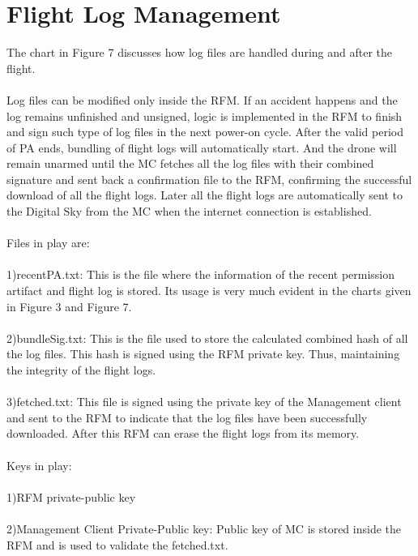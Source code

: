 \documentclass[18pt]{article}
\begin{document}
\section{Flight Log Management}
The chart in Figure 7 discusses how log files are handled during and after the flight.\\
\\
Log files can be modified only inside the RFM. If an accident happens and the log remains unfinished and unsigned, logic is implemented in the RFM to finish and sign such type of log files in the next power-on cycle.
After the valid period of PA ends, bundling of flight logs will automatically start. And the drone will remain unarmed until the MC fetches all the log files with their combined signature and sent back a confirmation file to the RFM, confirming the successful download of all the flight logs. Later all the flight logs are automatically sent to the Digital Sky from the MC when the internet connection is established.\\
\\
Files in play are:\\
\\
1)recentPA.txt: This is the file where the information of the recent permission artifact and flight log is stored. Its usage is very much evident in the charts given in Figure 3 and Figure 7.\\
\\
2)bundleSig.txt: This is the file used to store the calculated combined hash of all the log files. This hash is signed using the RFM private key. Thus, maintaining the integrity of the flight logs.\\
\\
3)fetched.txt: This file is signed using the private key of the Management client and sent to the RFM to indicate that the log files have been successfully downloaded. After this RFM can erase the flight logs from its memory.   \\
\\
Keys in play:\\
\\
1)RFM private-public key\\
\\
2)Management Client Private-Public key: Public key of MC is stored inside the RFM and is used to validate the fetched.txt. \\
\\
\end{document}
